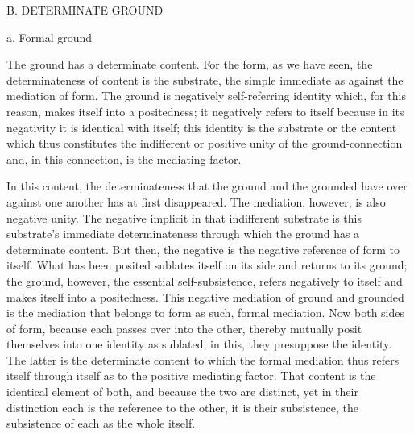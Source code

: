B. DETERMINATE GROUND

a. Formal ground

The ground has a determinate content.
For the form, as we have seen,
the determinateness of content is the substrate,
the simple immediate as against the mediation of form.
The ground is negatively self-referring identity which,
for this reason, makes itself into a positedness;
it negatively refers to itself because in its negativity
it is identical with itself;
this identity is the substrate or the content
which thus constitutes the indifferent
or positive unity of the ground-connection
and, in this connection, is the mediating factor.

In this content, the determinateness that
the ground and the grounded have over
against one another has at first disappeared.
The mediation, however, is also negative unity.
The negative implicit in that indifferent substrate is
this substrate's immediate determinateness through which
the ground has a determinate content.
But then, the negative is the negative reference of form to itself.
What has been posited sublates itself on its side
and returns to its ground;
the ground, however, the essential self-subsistence,
refers negatively to itself and makes itself into a positedness.
This negative mediation of ground and grounded is
the mediation that belongs to form as such, formal mediation.
Now both sides of form, because each passes over into the other,
thereby mutually posit themselves into one identity as sublated;
in this, they presuppose the identity.
The latter is the determinate content
to which the formal mediation thus refers itself
through itself as to the positive mediating factor.
That content is the identical element of both,
and because the two are distinct,
yet in their distinction each is
the reference to the other,
it is their subsistence,
the subsistence of each as the whole itself.

